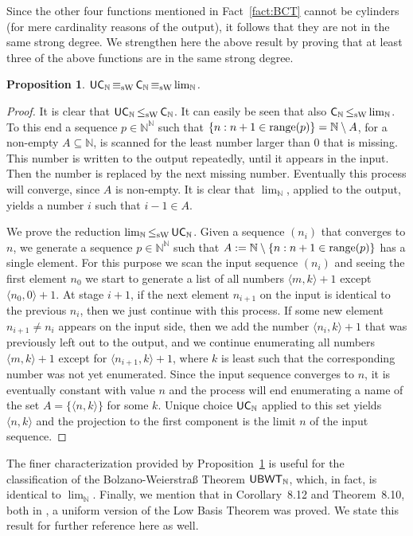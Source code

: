 \documentclass[a4paper]{amsart}
\def\IN{{\mathbb{N}}}
\def\In{\subseteq}
\def\range{{\rm range}}
\def\Baire{{\IN^\IN}}
\def\C{\mbox{\rm\sffamily C}}
\def\UC{\mbox{\rm\sffamily UC}}
\def\UBWT{\text{\rm\sffamily UBWT}}
\def\leqSW{\mathop{\leq_{\mathrm{sW}}}}
\def\equivSW{\mathop{\equiv_{\mathrm{sW}}}}
\newtheorem{proposition}[theorem]{Proposition}
\theoremstyle{definition}
\begin{document}
Since the other four functions mentioned in Fact~\ref{fact:BCT} cannot be cylinders (for mere cardinality reasons of the output), it follows
that they are not in the same strong degree. We strengthen here the above result by proving that at least
three of the above functions are in the same strong degree.

\begin{proposition}
\label{prop:unique-choice-N}
$\UC_\IN\equivSW\C_\IN\equivSW\lim_\IN$.
\end{proposition}
\begin{proof}
It is clear that $\UC_\IN\leqSW\C_\IN$. 
It can easily be seen that also $\C_\IN\leqSW\lim_\IN$. 
To this end a sequence $p\in\Baire$ such that $\{n:n+1\in\range(p)\}=\IN\setminus A$, for a non-empty $A\In\IN$,
is scanned for the least number larger than $0$ that is missing.
This number is written to the output repeatedly, until it appears in the input. Then the number is replaced
by the next missing number. Eventually this process will converge, since $A$ is non-empty.
It is clear that $\lim_\IN$, applied to the output, yields a number $i$ such that $i-1\in A$.

We prove the reduction $\lim_\IN\leqSW\UC_\IN$. Given a sequence $(n_i)$ that converges to $n$,
we generate a sequence $p\in\Baire$ such that $A:=\IN\setminus\{n:n+1\in\range(p)\}$ has a single element.
For this purpose we scan the input sequence $(n_i)$ and seeing the first element $n_0$
we start to generate a list of all numbers $\langle m,k\rangle+1$ except $\langle n_0,0\rangle+1$.
At stage $i+1$, if the next element $n_{i+1}$ on the input is identical to the previous $n_i$, then
we just continue with this process.
If some new element $n_{i+1}\not=n_i$ appears on the input side,
then we add the number $\langle n_i,k\rangle+1$ that was previously left out to the output,
and we continue enumerating all numbers $\langle m,k\rangle+1$ except for $\langle n_{i+1},k\rangle+1$, 
where $k$ is least such that the corresponding number was not yet enumerated.
Since the input sequence converges to $n$, it is eventually constant with value $n$ and the process will end
enumerating a name of the set $A=\{\langle n,k\rangle\}$ for some $k$.
Unique choice $\UC_\IN$ applied to this set yields $\langle n,k\rangle$ and the projection
to the first component is the limit $n$ of the input sequence.
\end{proof}

The finer characterization provided by Proposition~\ref{prop:unique-choice-N}
is useful for the classification of the Bolzano-Weierstra\ss{} Theorem $\UBWT_\IN$,
which, in fact, is identical to $\lim_\IN$.
Finally, we mention that in Corollary~8.12 and Theorem~8.10, both in \cite{BBP},
a uniform version of the Low Basis Theorem was proved. 
We state this result for further reference here as well.
\end{document}
